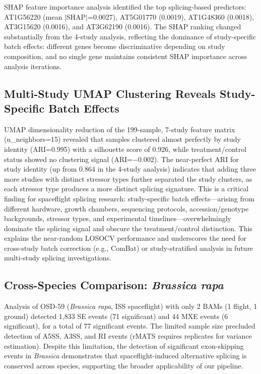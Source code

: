 \documentclass[12pt,a4paper]{article}
\begin{document}
SHAP feature importance analysis identified the top splicing-based predictors: AT1G56220 (mean $|$SHAP$|$=0.0027), AT5G01770 (0.0019), AT1G48360 (0.0018), AT3G15620 (0.0016), and AT3G62190 (0.0016). The SHAP ranking changed substantially from the 4-study analysis, reflecting the dominance of study-specific batch effects: different genes become discriminative depending on study composition, and no single gene maintains consistent SHAP importance across analysis iterations.

\subsection{Multi-Study UMAP Clustering Reveals Study-Specific Batch Effects}

UMAP dimensionality reduction of the 199-sample, 7-study feature matrix (n\_neighbors=15) revealed that samples clustered almost perfectly by study identity (ARI=0.995) with a silhouette score of 0.926, while treatment/control status showed no clustering signal (ARI=$-$0.002). The near-perfect ARI for study identity (up from 0.864 in the 4-study analysis) indicates that adding three more studies with distinct stressor types further separated the study clusters, as each stressor type produces a more distinct splicing signature. This is a critical finding for spaceflight splicing research: study-specific batch effects---arising from different hardware, growth chambers, sequencing protocols, accession/genotype backgrounds, stressor types, and experimental timelines---overwhelmingly dominate the splicing signal and obscure the treatment/control distinction. This explains the near-random LOSOCV performance and underscores the need for cross-study batch correction (e.g., ComBat) or study-stratified analysis in future multi-study splicing investigations.

\subsection{Cross-Species Comparison: \textit{Brassica rapa}}

Analysis of OSD-59 (\textit{Brassica rapa}, ISS spaceflight) with only 2 BAMs (1 flight, 1 ground) detected 1,833 SE events (71 significant) and 44 MXE events (6 significant), for a total of 77 significant events. The limited sample size precluded detection of A5SS, A3SS, and RI events (rMATS requires replicates for variance estimation). Despite this limitation, the detection of significant exon-skipping events in \textit{Brassica} demonstrates that spaceflight-induced alternative splicing is conserved across species, supporting the broader applicability of our pipeline.
\end{document}
